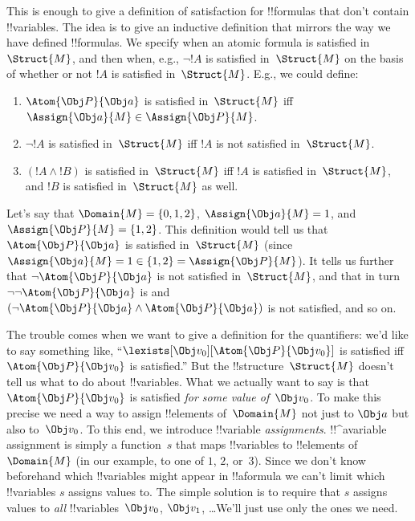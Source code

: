 This is enough to give a definition of satisfaction for !!{formula}s
that don't contain !!{variable}s.  The idea is to give an inductive
definition that mirrors the way we have defined !!{formula}s. We
specify when an atomic formula is satisfied in~$\Struct{M}$, and then
when, e.g., $\lnot !A$ is satisfied in~$\Struct{M}$ on the basis of
whether or not $!A$ is satisfied in~$\Struct{M}$. E.g., we could
define:
\begin{enumerate}
  \item $\Atom{\Obj P}{\Obj a}$ is satisfied in~$\Struct{M}$ iff
  $\Assign{\Obj a}{M} \in \Assign{\Obj P}{M}$.
  \item $\lnot !A$ is satisfied in~$\Struct{M}$ iff $!A$ is not
  satisfied in~$\Struct{M}$.
  \item $(!A \land !B)$ is satisfied in~$\Struct{M}$ iff $!A$ is
  satisfied in~$\Struct{M}$, and $!B$ is satisfied in~$\Struct{M}$ as
  well.
\end{enumerate}
Let's say that $\Domain{M} = \{0, 1, 2\}$, $\Assign{\Obj a}{M} = 1$,
and $\Assign{\Obj P}{M} = \{1, 2\}$. This definition would tell us
that $\Atom{\Obj P}{\Obj a}$ is satisfied in~$\Struct{M}$ (since
$\Assign{\Obj a}{M} =  1 \in \{1,2\} = \Assign{\Obj P}{M}$). It tells
us further that $\lnot \Atom{\Obj P}{\Obj a}$ is not satisfied
in~$\Struct{M}$, and that in turn $\lnot\lnot \Atom{\Obj P}{\Obj
a}$ is and $(\lnot \Atom{\Obj P}{\Obj a} \land \Atom{\Obj P}{\Obj a})$
is not satisfied, and so on.

The trouble comes when we want to give a definition for the
quantifiers: we'd like to say something like, ``$\lexists[\Obj
v_0][\Atom{\Obj P}{\Obj v_0}]$ is satisfied iff $\Atom{\Obj P}{\Obj
v_0}$ is satisfied.'' But the !!{structure}~$\Struct{M}$ doesn't tell
us what to do about !!{variable}s. What we actually want to say is
that $\Atom{\Obj P}{\Obj v_0}$ is satisfied \emph{for some value
of~$\Obj v_0$}.  To make this precise we need a way to assign
!!{element}s of~$\Domain{M}$ not just to $\Obj a$ but also to~$\Obj
v_0$. To this end, we introduce !!{variable} \emph{assignments}.
!!^a{variable} assignment is simply a function~$s$ that maps
!!{variable}s to !!{element}s of~$\Domain{M}$ (in our example, to one
of $1$, $2$, or~$3$).  Since we don't know beforehand which
!!{variable}s might appear in !!a{formula} we can't limit which
!!{variable}s $s$ assigns values to. The simple solution is to
require that $s$ assigns values to \emph{all} !!{variable}s~$\Obj
v_0$, $\Obj v_1$, \dots\@ We'll just use only the ones we need.

